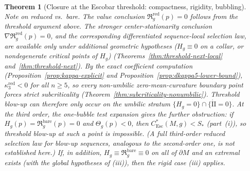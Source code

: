 \documentclass[11pt,reqno,a4paper]{amsart}
\numberwithin{equation}{section}
\theoremstyle{plain}
\newtheorem{theorem}{Theorem}[section]
\newcommand{\Esc}{\ensuremath{\mathrm{Esc}}}
\theoremstyle{remark}
\theoremstyle{plain}
\begin{document}
\begin{theorem}[Closure at the Escobar threshold: compactness, rigidity, bubbling]
\emph{Note on reduced vs.\ bare.}
The value conclusion $\mathfrak R_g^{\mathrm{red}}(p)=0$ follows from the
threshold argument above.  The stronger center-stationarity conclusion
$\nabla\mathfrak R_g^{\mathrm{red}}(p)=0$, and the corresponding differentiated
sequence-local selection law, are available only under additional geometric
hypotheses ($H_g\equiv0$ on a collar, or nondegenerate critical points of $H_g$)
(Theorems~\ref{thm:threshold-next-local} and~\ref{thm:threshold-next}).
By the exact coefficient computation (Proposition~\ref{prop:kappa-explicit}
and Proposition~\ref{prop:dkappa5-lower-bound}),
$\kappa_3^{\mathrm{red}}<0$ for all $n\ge5$,
so every non-umbilic zero-mean-curvature boundary point forces strict subcriticality
(Theorem~\ref{thm:subcriticality-nonumbilic}).
Threshold blow-up can therefore only occur on the umbilic stratum
$\{H_g=0\}\cap\{\mathring{\mathrm{II}}=0\}$.
At the third order, the one-bubble test expansion gives the further \emph{obstruction}:
if $H_g(p)=\mathfrak R_g^{\mathrm{bare}}(p)=0$ and $\Theta_g(p)<0$, then $C^*_{\Esc}(M,g)<S_\ast$ (part~\textup{(i)}),
so threshold blow-up at such a point is impossible.
(A full third-order \emph{reduced} selection law for blow-up sequences,
analogous to the second-order one, is not established here.)
If, in addition,
$H_g\equiv\mathfrak R_g^{\mathrm{bare}}\equiv0$ on all of $\partial M$ and an extremal exists (with the global hypotheses of \textup{(iii)}),
then the rigid case \textup{(iii)} applies.
\end{theorem}
\end{document}
